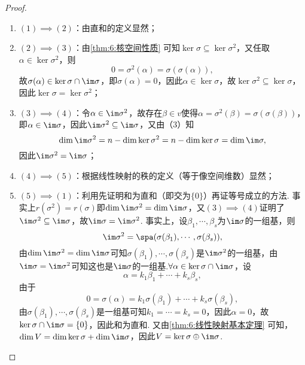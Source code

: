 \begin{enumerate}
          \begin{proof}
              \begin{enumerate}
                  \item $(1)\implies(2)$：由直和的定义显然；

                  \item $(2)\implies(3)$：由\autoref{thm:6:核空间性质} 可知$\ker\sigma\subseteq\ker\sigma^2$，又任取$\alpha\in\ker\sigma^2$，则
                        \[0=\sigma^2(\alpha)=\sigma(\sigma(\alpha)),\]故$\sigma(\alpha)\in\ker\sigma\cap\im\sigma$，即$\sigma(\alpha)=0$，因此$\alpha\in\ker\sigma$，故$\ker\sigma^2\subseteq\ker\sigma$，因此$\ker\sigma=\ker\sigma^2$；

                  \item $(3)\implies(4)$：令$\alpha\in\im\sigma^2$，故存在$\beta\in v$使得$\alpha=\sigma^2(\beta)=\sigma(\sigma(\beta))$，即$\alpha\in\im\sigma$，因此$\im\sigma^2\subseteq\im\sigma$，又由（3）知
                        \[\dim\im\sigma^2=n-\dim\ker\sigma^2=n-\dim\ker\sigma=\dim\im\sigma,\]
                        因此$\im\sigma^2=\im\sigma$；

                  \item $(4)\implies(5)$：根据线性映射的秩的定义（等于像空间维数）显然；

                  \item $(5)\implies(1)$：利用先证明和为直和（即交为$\{0\}$）再证等号成立的方法. 事实上$r(\sigma^2)=r(\sigma)$即$\dim\im\sigma^2=\dim\im\sigma$，又$(3)\implies(4)$证明了$\im\sigma^2\subseteq\im\sigma$，故$\im \sigma=\im \sigma^2$. 事实上，设$\beta_1,\cdots,\beta_s$为$\im\sigma$的一组基，则
                        \[\im\sigma^2=\spa(\sigma(\beta_1),\cdots,\sigma(\beta_s)),\]
                        由$\dim\im\sigma^2=\dim\im\sigma$可知$\sigma(\beta_1),\cdots,\sigma(\beta_s)$是$\im\sigma^2$的一组基，由$\im \sigma=\im \sigma^2$可知这也是$\im\sigma$的一组基.$\forall\alpha\in\ker\sigma\cap\im\sigma$，设
                        \[\alpha=k_1\beta_1+\cdots+k_s\beta_s,\]
                        由于
                        \[0=\sigma(\alpha)=k_1\sigma(\beta_1)+\cdots+k_s\sigma(\beta_s),\]
                        由$\sigma(\beta_1),\cdots,\sigma(\beta_s)$是一组基可知$k_1=\cdots=k_s=0$，因此$\alpha=0$，故$\ker\sigma\cap\im\sigma=\{0\}$，因此和为直和. 又由\autoref{thm:6:线性映射基本定理} 可知，$\dim V=\dim\ker\sigma+\dim\im \sigma$，因此$V=\ker\sigma\oplus\im \sigma$.
              \end{enumerate}
          \end{proof}


\end{enumerate}
